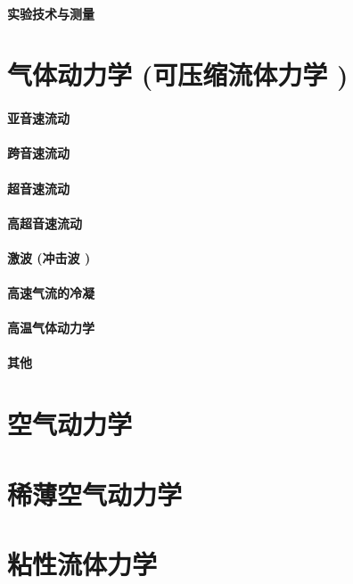 \documentclass[UTF8]{../../06-Physics}
\begin{document}
    \subsubsection{实验技术与测量}



\chapter{气体动力学 (可压缩流体力学 )}
    \subsubsection{亚音速流动}
    \subsubsection{跨音速流动}
    \subsubsection{超音速流动}
    \subsubsection{高超音速流动}
    \subsubsection{激波 (冲击波 )}
    \subsubsection{高速气流的冷凝}
    \subsubsection{高温气体动力学}
    \subsubsection{其他}



\chapter{空气动力学}
\chapter{稀薄空气动力学}


\chapter{粘性流体力学}
\end{document}
